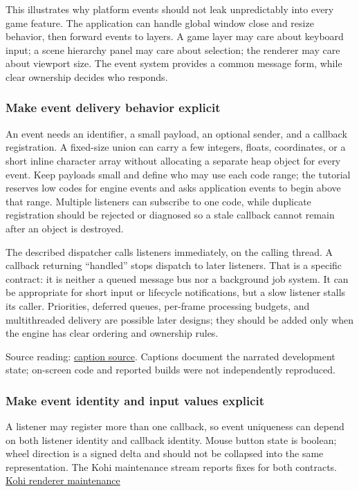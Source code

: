This illustrates why platform events should not leak unpredictably into every game feature. The application can handle global window close and resize behavior, then forward events to layers. A game layer may care about keyboard input; a scene hierarchy panel may care about selection; the renderer may care about viewport size. The event system provides a common message form, while clear ownership decides who responds.

\subsubsection{Make event delivery behavior explicit}\label{05-engine-i-ch013-make-event-delivery-behavior-explicit}

An event needs an identifier, a small payload, an optional sender, and a callback registration. A fixed-size union can carry a few integers, floats, coordinates, or a short inline character array without allocating a separate heap object for every event. Keep payloads small and define who may use each code range; the tutorial reserves low codes for engine events and asks application events to begin above that range. Multiple listeners can subscribe to one code, while duplicate registration should be rejected or diagnosed so a stale callback cannot remain after an object is destroyed.

The described dispatcher calls listeners immediately, on the calling thread. A callback returning ``handled'' stops dispatch to later listeners. That is a specific contract: it is neither a queued message bus nor a background job system. It can be appropriate for short input or lifecycle notifications, but a slow listener stalls its caller. Priorities, deferred queues, per-frame processing budgets, and multithreaded delivery are possible later designs; they should be added only when the engine has clear ordering and ownership rules.

Source reading: \href{https://www.youtube.com/watch?v=XQ6qljkh2KI}{caption source}. Captions document the narrated development state; on-screen code and reported builds were not independently reproduced.

\subsubsection{Make event identity and input values explicit}\label{05-engine-i-ch013-make-event-identity-and-input-values-explicit}

A listener may register more than one callback, so event uniqueness can depend on both listener identity and callback identity. Mouse button state is boolean; wheel direction is a signed delta and should not be collapsed into the same representation. The Kohi maintenance stream reports fixes for both contracts. \href{https://www.youtube.com/watch?v=x8ao57nbMlY}{Kohi renderer maintenance}

